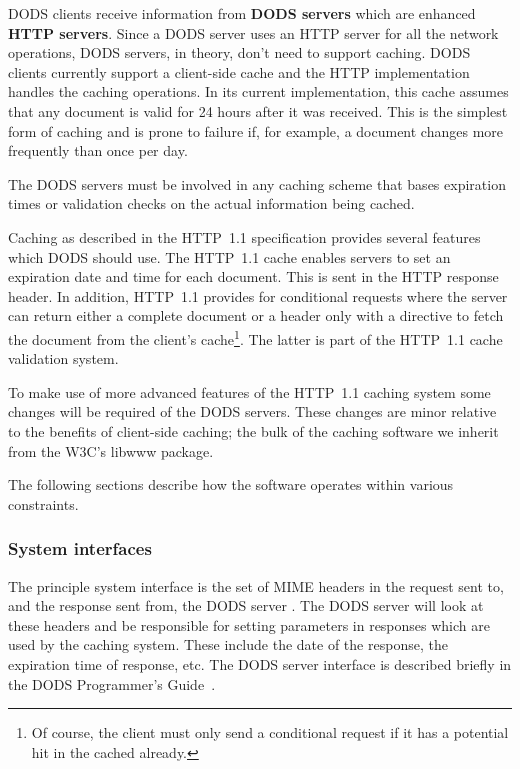 \documentclass{article}
\begin{document}
DODS clients receive information from \textbf{DODS
  servers} which are enhanced \textbf{HTTP
  servers}.  Since a DODS server uses an HTTP server
for all the network operations, DODS servers, in theory, don't need to
support caching.  DODS clients currently support a client-side cache and the
HTTP implementation handles the caching operations. In its current
implementation, this cache assumes that any document is valid for 24 hours
after it was received. This is the simplest form of caching and is prone to
failure if, for example, a document changes more frequently than once per
day.

The DODS servers must be involved in any caching scheme that bases
expiration times or validation checks on the actual information being cached.

Caching as described in the HTTP~1.1 specification provides several features
which DODS should use. The HTTP~1.1 cache enables servers to set an
expiration date and time for each document. This is sent in the HTTP response
header. In addition, HTTP~1.1 provides for conditional requests where the
server can return either a complete document or a header only with a
directive to fetch the document from the client's cache\footnote{Of course,
  the client must only send a conditional request if it has a potential hit
  in the cached already.}. The latter is part of the HTTP~1.1 cache
validation system.

To make use of more advanced features of the HTTP~1.1 caching system some
changes will be required of the DODS servers. These changes are minor
relative to the benefits of client-side caching; the bulk of the caching
software we inherit from the \acs{W3C}'s libwww package.

The following sections describe how the software operates within various
constraints.

\subsubsection{System interfaces}
The principle system interface is the set of MIME headers in the request sent
to, and the response sent from, the DODS server . The DODS server will look
at these headers and be responsible for setting parameters in responses which
are used by the caching system. These include the date of the response, the
expiration time of response, etc. The DODS server interface is described
briefly in the DODS Programmer's Guide~\cite{DODS:prog-guide}.
\end{document}
